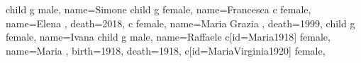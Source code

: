 \documentclass{article}
\begin{document}
\begin{midpage}
\begin{center}
\begin{genealogypicture}
{{{{{{{{{{{{{                                                }
                                                child{
                                                    g{
                                                        male,
                                                        name={Simone }
                                                    }
                                                }
                                                child{
                                                    g{
                                                        female,
                                                        name={Francesca }
                                                    }
                                                }
                                            }
                                            c{
                                                female,
                                                name={Elena },
                                                death={2018}{},
                                            }
                                            c{
                                                female,
                                                name={Maria Grazia },
                                                death={1999}{},
                                            }
                                            child{
                                                g{
                                                    female,
                                                    name={Ivana }
                                                }
                                            }
                                            child{
                                                g{
                                                    male,
                                                    name={Raffaele }
                                                }
                                            }
                                        }
                                        c[id=Maria1918]{
                                            female,
                                            name={Maria },
                                            birth={1918}{},
                                            death={1918}{},
                                        }
                                        c[id=MariaVirginia1920]{
                                            female,
}}}}}}}}}}}
\end{genealogypicture}
\end{center}
\end{midpage}
\end{document}
